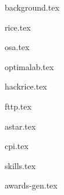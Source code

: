 \documentclass[11pt]{article}
\begin{document}
{background.tex}


{rice.tex}


{osa.tex}

{optimalab.tex}

{hackrice.tex}

{fttp.tex}

{astar.tex}

{cpi.tex}





{skills.tex}


{awards-gen.tex}
\end{document}
